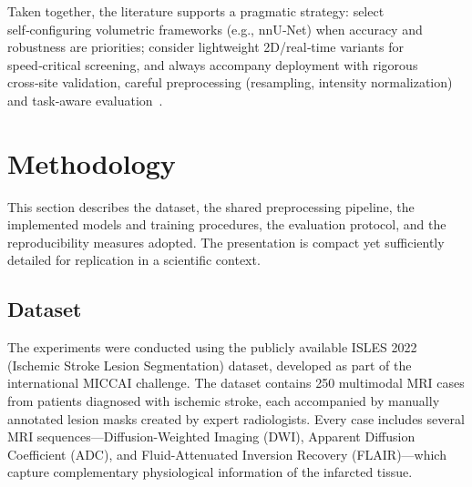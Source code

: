\documentclass[12pt]{article}
\begin{document}
Taken together, the literature supports a pragmatic strategy: select self‑configuring volumetric frameworks (e.g., nnU‑Net) when accuracy and robustness are priorities; consider lightweight 2D/real‑time variants for speed‑critical screening, and always accompany deployment with rigorous cross‑site validation, careful preprocessing (resampling, intensity normalization) and task‑aware evaluation~\cite{Isensee2021,liFullyConvolutionalNetwork2018,Menze2015}.


\section{Methodology} 
\label{sec:methodology}

This section describes the dataset, the shared preprocessing pipeline, the implemented models and training procedures, the evaluation protocol, and the reproducibility measures adopted. The presentation is compact yet sufficiently detailed for replication in a scientific context.

\subsection{Dataset} 
\label{subsec:dataset}

The experiments were conducted using the publicly available ISLES 2022~\cite{liewLargeCuratedOpensource2021} (Ischemic Stroke Lesion Segmentation) dataset, developed as part of the international MICCAI challenge. The dataset contains 250 multimodal MRI cases from patients diagnosed with ischemic stroke, each accompanied by manually annotated lesion masks created by expert radiologists. Every case includes several MRI sequences—Dif\-fusion-Weighted Imaging (DWI), Apparent Diffusion Coefficient (ADC), and Fluid-Attenua\-ted Inversion Recovery (FLAIR)—which capture complementary physiological information of the infarcted tissue.
\end{document}
